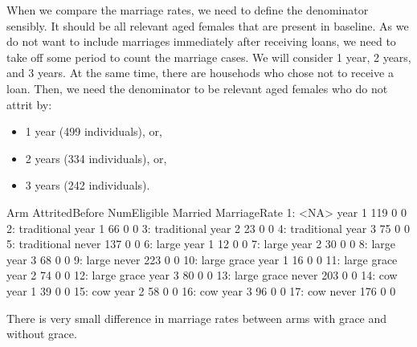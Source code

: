 When we compare the marriage rates, we need to define the denominator sensibly. It should be all relevant aged females that are present in baseline. As we do not want to include marriages immediately after receiving loans, we need to take off some period to count the marriage cases. We will consider 1 year, 2 years, and 3 years. At the same time, there are househods who chose not to receive a loan. 
Then, we need the denominator to be relevant aged females who do not attrit by:
\begin{itemize}
\vspace{1.0ex}\setlength{\itemsep}{1.0ex}\setlength{\baselineskip}{12pt}
\item	1 year (499 individuals), or,
\item	2 years (334 individuals), or,
\item	3 years (242 individuals).
\end{itemize}
\begin{Schunk}
\begin{Soutput}
            Arm AttritedBefore NumEligible Married MarriageRate
 1:        <NA>         year 1         119       0            0
 2: traditional         year 1          66       0            0
 3: traditional         year 2          23       0            0
 4: traditional         year 3          75       0            0
 5: traditional          never         137       0            0
 6:       large         year 1          12       0            0
 7:       large         year 2          30       0            0
 8:       large         year 3          68       0            0
 9:       large          never         223       0            0
10: large grace         year 1          16       0            0
11: large grace         year 2          74       0            0
12: large grace         year 3          80       0            0
13: large grace          never         203       0            0
14:         cow         year 1          39       0            0
15:         cow         year 2          58       0            0
16:         cow         year 3          96       0            0
17:         cow          never         176       0            0
\end{Soutput}
\end{Schunk}
\begin{palepinkleftbar}
\begin{finding}
There is very small difference in marriage rates between arms with grace and without grace.
\end{finding}
\end{palepinkleftbar}


